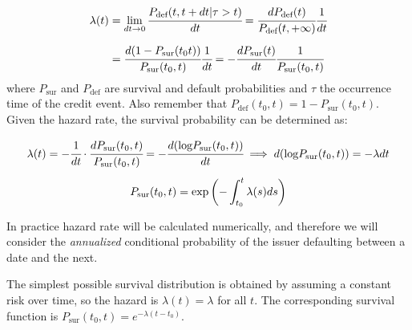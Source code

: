 \begin{equation}
\begin{split}
\lambda(t)& = \lim_{dt\rightarrow 0} \cfrac{P_{\textrm{def}}(t, t+dt|\tau> t)}{dt} = \cfrac{dP_{\textrm{def}}(t)}{P_{\textrm{def}}(t, +\infty)}\cfrac{1}{dt}\\[5 pt] &
= \cfrac{d(1-P_{\textrm{sur}}(t_0 t))}{P_{\textrm{sur}}(t_0, t)}\cfrac{1}{dt} = -\cfrac{dP_{\textrm{sur}}(t)}{dt}\cfrac{1}{P_{\textrm{sur}}(t_0, t)}
\end{split}
\end{equation}
where $P_{\textrm{sur}}$ and $P_{\textrm{def}}$ are survival and default probabilities and $\tau$ the occurrence time of the credit event.
Also remember that $P_{\textrm{def}}(t_0, t) = 1 - P_{\textrm{sur}}(t_0, t)$. Given the hazard rate, the survival probability can be determined as:


\begin{equation}
\begin{gathered}
\lambda(t) = -\cfrac{1}{dt}\cdot\cfrac{dP_{\textrm{sur}}(t_0, t)}{P_{\textrm{sur}}(t_0, t)} = -\cfrac{d(\textrm{log}P_{\textrm{sur}}(t_0, t))}{dt} \implies d(\textrm{log}P_{\textrm{sur}}(t_0, t)) = -\lambda dt\\[5pt]
P_{\textrm{sur}}(t_0, t) = \mathrm{exp}\left(-\int_{t_0}^{t}\lambda(s) ds\right)
\end{gathered}
\label{eq:constant_hazard_rate_prob}
\end{equation}

In practice hazard rate will be calculated numerically, and therefore we will consider the \emph{annualized} conditional probability of the issuer defaulting between a date and the next.

\label{sec:constant_hazard_rate}
The simplest possible survival distribution is obtained by assuming a constant risk over time, so the hazard is $\lambda (t)=\lambda$ for all $t$. The corresponding survival function is $P_{\textrm{sur}}(t_0, t) = e^{−\lambda (t-t_0)}$.

